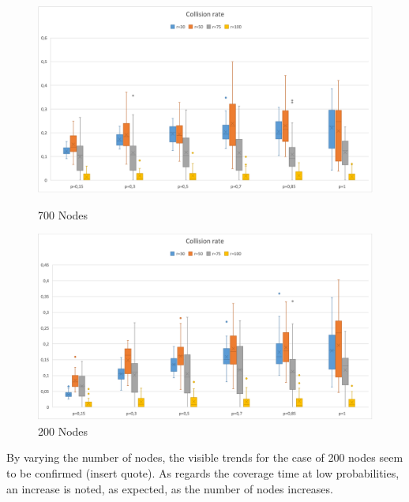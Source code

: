 \begin{figure}[H]
  \includegraphics[width=\linewidth]{./images/Collision700Boxplot.png}
  \caption{700 Nodes}\label{fig:awesome_image1}
\endminipage\hfill
{}
  \includegraphics[width=\linewidth]{./images/Collision200Boxplot.png}
  \caption{200 Nodes}\label{fig:awesome_image2}
\endminipage
\end{figure}

By varying the number of nodes, the visible trends for the case of 200 nodes seem to be confirmed (insert quote). As regards the coverage time at low probabilities, an increase is noted, as expected, as the number of nodes increases.
